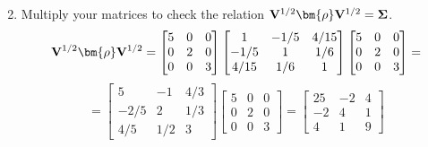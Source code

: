\begin{enumerate}[label=(\alph*)]
\[            \]
            \item Multiply your matrices to check the relation $\bold{V}^{1/2}\bm{\rho}\bold{V}^{1/2} = \bold{\Sigma}$.
            \[
                \bold{V}^{1/2}\bm{\rho}\bold{V}^{1/2} 
                = 
                \begin{bmatrix}
                5 & 0 & 0 \\
                0 & 2 & 0 \\
                0 & 0 & 3   
                \end{bmatrix}
                \begin{bmatrix}
                    1 & -1/5 & 4/15 \\
                    -1/5 & 1 & 1/6 \\
                    4/15 & 1/6 & 1
                \end{bmatrix}
                \begin{bmatrix}
                    5 & 0 & 0 \\
                    0 & 2 & 0 \\
                    0 & 0 & 3   
                \end{bmatrix}
                =
            \]
            \[
                =
                \begin{bmatrix}
                    5 & -1 & 4/3 \\
                    -2/5 & 2 & 1/3 \\
                    4/5 & 1/2 & 3
                \end{bmatrix}
                \begin{bmatrix}
                    5 & 0 & 0 \\
                    0 & 2 & 0 \\
                    0 & 0 & 3   
                \end{bmatrix}
                =
                \begin{bmatrix}
                    25 & -2 & 4 \\
                    -2 & 4 & 1 \\
                    4 & 1 & 9
                \end{bmatrix}
            \]
        \end{enumerate}